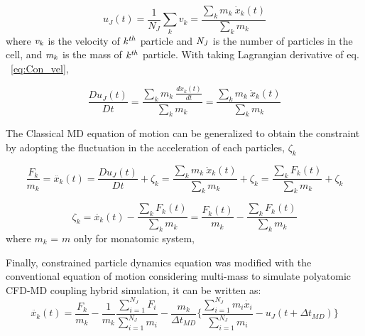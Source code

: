 \documentclass[]{aiaa-tc}%
\begin{document}
\begin{equation}
 u_{J}(t) = \frac{1}{N_{J}} \displaystyle\sum_{k} v_{k} =  {  \frac{\displaystyle\sum_{k}m_{k}\  {\dot x_k(t)}} {\displaystyle\sum_{k}m_{k}}}
 \label{eq:Con_vel}
\end{equation}
\normalsize
where $\it v_{k}$ is the velocity of $\it k^{th}$ particle and $\it N_{J}$ is the number of particles in the cell, and $\it m_{k}$ is the mass of $\it k^{th}$ particle.  With taking Lagrangian derivative of eq. ~\ref{eq:Con_vel},

\vspace{-.2em}
\begin{equation}
 \frac{Du_{J}(t)}{Dt} = {  \frac{\displaystyle\sum_{k}m_{k}\  \frac{d\dot x_k(t)}{dt} } {\displaystyle\sum_{k}m_{k}}} = {  \frac{\displaystyle\sum_{k}m_{k}\  {\ddot x_k(t)}} {\displaystyle\sum_{k}m_{k}}}
 \label{eq:gov1}
\end{equation}
\normalsize

The Classical MD equation of motion can be generalized to obtain the constraint by adopting the fluctuation in the acceleration of each particles, $\zeta_{k}$

\vspace{-.2em}
\begin{equation}
\frac{F_{k}}{m_{k}}  =  \ddot{x_{k}}(t) =  \frac{Du_{J}(t)}{Dt} + \zeta_{k} = {  \frac{\displaystyle\sum_{k}m_{k}\  {\ddot x_k(t)}} {\displaystyle\sum_{k}m_{k}}}+ \zeta_{k} =  {  \frac{\displaystyle\sum_{k}F_{k}(t)} {\displaystyle\sum_{k}m_{k}}}+ \zeta_{k}
 \label{eq:zeta1}
\end{equation}

\begin{equation}
\zeta_{k} = \ddot{x_{k}}(t) - {  \frac{\displaystyle\sum_{k}F_{k}(t)} {\displaystyle\sum_{k}m_{k}}}= \frac{F_{k}(t)}{m_{k}} - {  \frac{\displaystyle\sum_{k}F_{k}(t)} {\displaystyle\sum_{k}m_{k}}} 
 \label{eq:zeta2}
\end{equation}
\normalsize
where $m_k$  = $m$ only for monatomic system, 

Finally, constrained particle dynamics equation was modified with the conventional equation of motion considering multi-mass to simulate polyatomic CFD-MD coupling hybrid simulation, it can be written as:
\vspace{-.2em}
\begin{equation}
 \ddot{x_{k}}(t) = \frac{F_{k}}{m_{k}} -  \frac{1}{m_k} \frac{\displaystyle\sum_{i=1}^{N_J}F_{i}} {\displaystyle\sum_{i=1}^{N_J}m_{i}} - \frac{m_k}{\Delta t_{MD}} \{  \frac{\displaystyle\sum_{i=1}^{N_J}m_{i}\dot{x_{i}}} {\displaystyle\sum_{i=1}^{N_J}m_{i}} - u_{J}(t + \Delta t_{MD})\}
 \label{eq:EOM}
\end{equation}
\normalsize
\end{document}
